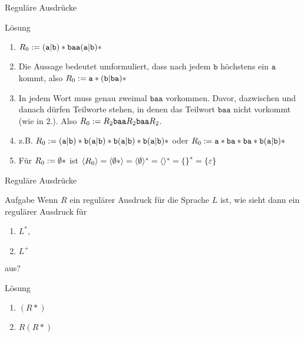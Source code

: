 \begin{frame}{Reguläre Ausdrücke}
\newcommand{\any}{(\texttt{a} | \texttt{b}) *}
\begin{block}{Lösung}
	\begin{enumerate}
		\item $R_\theenumi := \any \texttt{baa} \any $
		\item Die Aussage bedeutet umformuliert, dass nach jedem $\texttt{b}$ höchstens ein $\texttt{a}$ kommt, also $R_\theenumi := \texttt{a} * (\texttt{b} | \texttt{ba} ) * $
		\item In jedem Wort muss genau zweimal $\texttt{baa}$ vorkommen. Davor, dazwischen und danach dürfen Teilworte stehen, in denen das Teilwort $\texttt{baa}$ nicht vorkommt (wie in 2.). Also $R_\theenumi := R_2 \texttt{baa} R_2 \texttt{baa} R_2$.
		\item z.B. $R_\theenumi := \any \texttt{b} \any \texttt{b}\any \texttt{b} \any $
		oder $R_\theenumi := \texttt{a} * \texttt{ba} * \texttt{ba} * \texttt{b} \any$
		\item Für $R_\theenumi := \emptyset *$ ist $\lang{R_\theenumi} = \lang{\emptyset *} = \lang{\emptyset}^* = \lang{}^* = \set{}^* = \set{\varepsilon}$
	\end{enumerate}
\end{block}
\end{frame}

\begin{frame}{Reguläre Ausdrücke}
\begin{exampleblock}{Aufgabe}
	Wenn $R$ ein regulärer Ausdruck für die Sprache $L$ ist, wie sieht dann ein regulärer Ausdruck für
	\begin{enumerate}
		\item $L^*$,
		\item $L^+$
	\end{enumerate}
	aus?
\end{exampleblock}
\pause
\begin{block}{Lösung}
	\begin{enumerate}
		\item $(R*)$
		\item $R(R*)$
	\end{enumerate}
\end{block}
\end{frame}

